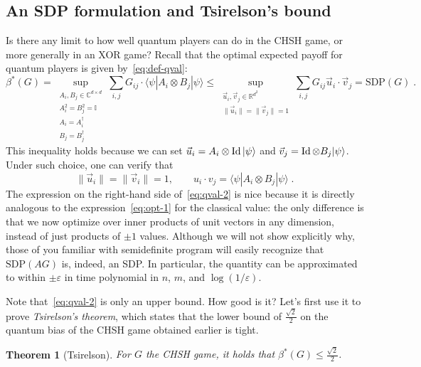 \documentclass{report}
\theoremstyle{plain}
\newtheorem{theorem}[subsection]{Theorem}
\theoremstyle{definition}
\theoremstyle{remark}
\newcommand{\ket}[1]{|#1\rangle}
\newcommand{\bra}[1]{\langle#1|}
\newcommand{\Id}{\ensuremath{\mathop{\rm Id}\nolimits}}
\newcommand{\C}{\ensuremath{\mathbb{C}}}
\newcommand{\R}{\ensuremath{\mathbb{R}}}
\newcommand{\eps}{\varepsilon}
\numberwithin{equation}{subsection}
\begin{document}
\subsection{An SDP formulation and Tsirelson's bound}
\label{section:sdp}

Is there any limit to how well quantum players can do in the CHSH game, or more generally in an XOR game? Recall that the optimal expected payoff for quantum players is given by~\eqref{eq:def-qval}:
\begin{equation}\label{eq:qval-2}
\beta^*(G)=\sup_{\substack{A_i,B_j\in\C^{d\times d}\\ A_i^2=B_j^2=\mathbb{I}\\ A_i=A_i^\dagger\\ B_j=B_j^\dagger}}\sum_{i,j} G_{ij}\cdot\bra{\psi} A_i\otimes B_j\ket{\psi} \le \sup_{\substack{\vec{u}_i,\vec{v}_j\in \R^{d^2}\\ \|\vec{u}_i\|=\|\vec{v}_j\|=1}}\sum_{i,j} G_{ij}\vec{u}_i\cdot \vec{v}_j = \text{SDP}(G)\;.
\end{equation}
This inequality holds because we can set $\vec{u}_i=A_i \otimes \Id \ket{\psi}$ and $\vec{v}_j=\Id\otimes B_j \ket{\psi}$. Under such choice, one can verify that
$$
\|\vec{u}_i\|=\|\vec{v}_i\|=1,\qquad 
u_i\cdot v_j=\bra{\psi} A_i \otimes B_j \ket{\psi}\;.
$$
The expression on the right-hand side of~\eqref{eq:qval-2} is nice because it is directly analogous to the expression~\eqref{eq:opt-1} for the classical value: the only difference is that we now optimize over inner products of unit vectors in any dimension, instead of just products of $\pm 1$ values. Although we will not show explicitly why, those of you familiar with semidefinite program will easily recognize that $\text{SDP}(AG)$ is, indeed, an SDP. In particular, the quantity can be approximated to within $\pm\eps$ in time polynomial in $n$, $m$, and $\log(1/\eps)$. 

Note that~\eqref{eq:qval-2} is only an upper bound. How good is it? Let's first use it to prove \emph{Tsirelson's theorem}, which states that the lower bound of $\frac{\sqrt{2}}{2}$ on the quantum bias of the CHSH game obtained earlier is tight. 

\begin{theorem}[Tsirelson]\label{thm:tsirelson}
For $G$ the CHSH game, it holds that $\beta^*(G) \leq \frac{\sqrt{2}}{2}$.
\end{theorem}
\end{document}
